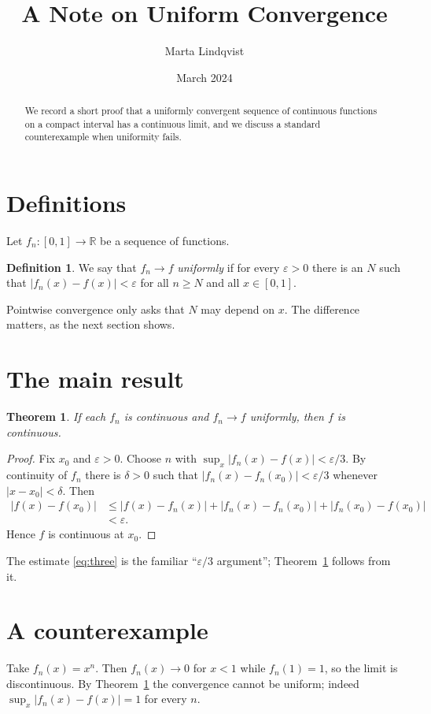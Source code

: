 \documentclass[11pt,letterpaper]{article}
\title{A Note on Uniform Convergence}
\author{Marta Lindqvist}
\date{March 2024}
\newtheorem{theorem}{Theorem}
\theoremstyle{definition}
\newtheorem{definition}{Definition}
\begin{document}
\maketitle
\begin{abstract}
We record a short proof that a uniformly convergent sequence of continuous functions on a compact interval has a continuous limit, and we discuss a standard counterexample when uniformity fails.
\end{abstract}

\section{Definitions}
Let $f_n\colon[0,1]\to\mathbb{R}$ be a sequence of functions.

\begin{definition}\label{def:unif}
We say that $f_n\to f$ \emph{uniformly} if for every $\varepsilon>0$ there is an $N$ such that $|f_n(x)-f(x)|<\varepsilon$ for all $n\ge N$ and all $x\in[0,1]$.
\end{definition}

Pointwise convergence only asks that $N$ may depend on $x$. The difference matters, as the next section shows.

\section{The main result}
\begin{theorem}\label{thm:cont}
If each $f_n$ is continuous and $f_n\to f$ uniformly, then $f$ is continuous.
\end{theorem}
\begin{proof}
Fix $x_0$ and $\varepsilon>0$. Choose $n$ with $\sup_x|f_n(x)-f(x)|<\varepsilon/3$. By continuity of $f_n$ there is $\delta>0$ such that $|f_n(x)-f_n(x_0)|<\varepsilon/3$ whenever $|x-x_0|<\delta$. Then
\begin{align}
|f(x)-f(x_0)| &\le |f(x)-f_n(x)|+|f_n(x)-f_n(x_0)|+|f_n(x_0)-f(x_0)| \nonumber\\
&< \varepsilon. \label{eq:three}
\end{align}
Hence $f$ is continuous at $x_0$.
\end{proof}

The estimate \eqref{eq:three} is the familiar ``$\varepsilon/3$ argument''; Theorem~\ref{thm:cont} follows from it.

\section{A counterexample}
Take $f_n(x)=x^n$. Then $f_n(x)\to0$ for $x<1$ while $f_n(1)=1$, so the limit is discontinuous. By Theorem~\ref{thm:cont} the convergence cannot be uniform; indeed $\sup_x |f_n(x)-f(x)|=1$ for every $n$.
\end{document}
